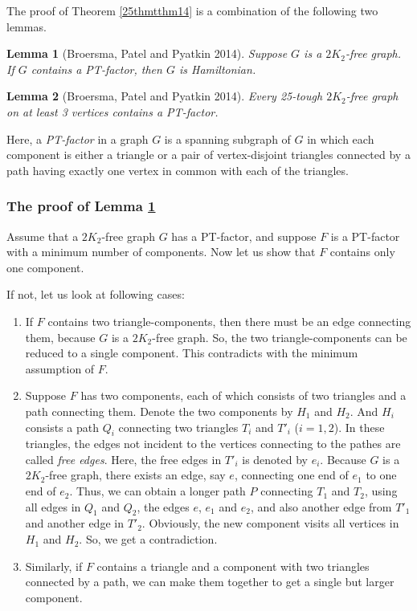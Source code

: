 \documentclass[12pt]{report}
\newtheorem{lemma}{Lemma}
\begin{document}
The proof of Theorem \ref{25thmtthm14} is a combination of the following two lemmas.
\begin{lemma}[Broersma, Patel and Pyatkin 2014]\label{lm4inbpp}
Suppose $G$ is a $2K_2$-free graph. If $G$ contains a PT-factor, then $G$ is Hamiltonian.
\end{lemma}

\begin{lemma}[Broersma, Patel and Pyatkin 2014]\label{lm5inbpp}
Every 25-tough $2K_2$-free graph on at least 3 vertices contains a PT-factor.
\end{lemma}

Here, a {\em PT-factor} in a graph $G$ is a spanning subgraph of $G$ in which each component is either a triangle or a pair of vertex-disjoint triangles connected by a path having exactly one vertex in common with each of the triangles.

\subsubsection{The proof of Lemma \ref{lm4inbpp}}

Assume that a $2K_2$-free graph $G$ has a PT-factor, and suppose $F$ is a PT-factor with a minimum number of components. Now let us show that $F$ contains only one component.

If not, let us look at following cases:
\begin{enumerate}
\item If $F$ contains two triangle-components, then there must be an edge connecting them, because $G$ is a $2K_2$-free graph. So, the two triangle-components can be reduced to a single component. This contradicts with the minimum assumption of $F$.
\item Suppose $F$ has two components, each of which consists of two triangles and a path connecting them. Denote the two components by $H_1$ and $H_2$. And $H_i$ consists a path $Q_i$ connecting two triangles $T_i$ and $T'_i$ ($i=1,2$). In these triangles, the edges not incident to the vertices connecting to the pathes are called {\em free edges}. Here, the free edges in $T'_i$ is denoted by $e_i$. Because $G$ is a $2K_2$-free graph, there exists an edge, say $e$, connecting one end of $e_1$ to one end of $e_2$. Thus, we can obtain a longer path $P$ connecting $T_1$ and $T_2$, using all edges in $Q_1$ and $Q_2$, the edges $e$, $e_1$ and $e_2$, and also another edge from $T'_1$ and another edge in $T'_2$. Obviously, the new component visits all vertices in $H_1$ and $H_2$. So, we get a contradiction.
\item Similarly, if $F$ contains a triangle and a component with two triangles connected by a path, we can make them together to get a single but larger component.
\end{enumerate}
\end{document}
